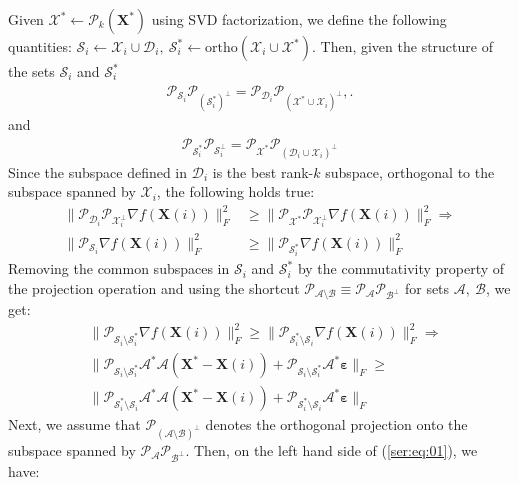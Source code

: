 \documentclass[twocolumn]{svjour3}
\newcommand{\vectornormbig}[1]{\big\|#1\big\|}
\newcommand{\sensing}{\boldsymbol{\mathcal{A}}}
\newcommand{\signal}{\boldsymbol{X}}
\newcommand{\bestsignal}{\boldsymbol{X}^\ast}
\newcommand{\noise}{\boldsymbol{\varepsilon}}
\newcommand{\rank}{k}
\begin{document}
Given $ \mathcal{X}^\ast \leftarrow \mathcal{P}_{\rank}(\bestsignal) $ using SVD factorization, we define the following quantities: $ \mathcal{S}_i \leftarrow \mathcal{X}_i \cup \mathcal{D}_i,~ \mathcal{S}^\ast_i \leftarrow \text{ortho}\left(\mathcal{X}_i \cup \mathcal{X}^\ast\right) $. Then, given the structure of the sets $\mathcal{S}_i$ and $\mathcal{S}_i^{\ast}$
\begin{align}
\mathcal{P}_{\mathcal{S}_i} \mathcal{P}_{(\mathcal{S}_i^\ast)^{\bot}} = \mathcal{P}_{\mathcal{D}_i} \mathcal{P}_{(\mathcal{X}^\ast \cup \mathcal{X}_i)^{\bot}},  \label{ser:eq:00}.
\end{align} and 
\begin{align}
\mathcal{P}_{\mathcal{S}^\ast_i} \mathcal{P}_{\mathcal{S}_i^{\bot}} = \mathcal{P}_{\mathcal{X}^\ast} \mathcal{P}_{(\mathcal{D}_i \cup \mathcal{X}_i)^{\bot}}
\end{align} Since the subspace defined in $ \mathcal{D}_i $ is the best rank-$ \rank $ subspace, orthogonal to the subspace spanned by $ \mathcal{X}_i $, the following holds true:
\begin{align}
\vectornormbig{\mathcal{P}_{\mathcal{D}_i} \mathcal{P}_{\mathcal{X}_i^{\bot}} \nabla f(\signal(i))}_F^2 &\geq \vectornormbig{\mathcal{P}_{\mathcal{X}^\ast} \mathcal{P}_{\mathcal{X}_i^{\bot}} \nabla f(\signal(i))}_F^2 \Rightarrow \nonumber \\
\vectornormbig{\mathcal{P}_{\mathcal{S}_i} \nabla f(\signal(i))}_F^2 &\geq \vectornormbig{\mathcal{P}_{\mathcal{S}_i^\ast} \nabla f(\signal(i))}_F^2 \nonumber
\end{align} Removing the common subspaces in $ \mathcal{S}_i $ and $ \mathcal{S}_i^\ast $ by the commutativity property of the projection operation and using the shortcut $\mathcal{P}_{\mathcal{A} \setminus \mathcal{B}} \equiv \mathcal{P}_{\mathcal{A}} \mathcal{P}_{\mathcal{B}^{\bot}} $ for sets $\mathcal{A}, ~\mathcal{B}$, we get:
\begin{align}
&\vectornormbig{\mathcal{P}_{\mathcal{S}_i \setminus \mathcal{S}_i^\ast} \nabla f(\signal(i))}_F^2 \geq \vectornormbig{\mathcal{P}_{\mathcal{S}_i^\ast \setminus \mathcal{S}_i} \nabla f(\signal(i))}_F^2 \Rightarrow \nonumber \\
&\vectornormbig{\mathcal{P}_{\mathcal{S}_i \setminus \mathcal{S}_i^\ast} \sensing^\ast \sensing (\bestsignal - \signal(i)) + \mathcal{P}_{\mathcal{S}_i \setminus \mathcal{S}_i^\ast} \sensing^\ast \noise}_F \geq \nonumber \\ &\vectornormbig{\mathcal{P}_{\mathcal{S}_i^\ast \setminus \mathcal{S}_i} \sensing^\ast \sensing (\bestsignal - \signal(i)) + \mathcal{P}_{\mathcal{S}_i^\ast \setminus \mathcal{S}_i} \sensing^\ast \noise}_F \label{ser:eq:01}
\end{align} Next, we assume that $\mathcal{P}_{(\mathcal{A} \setminus \mathcal{B})^{\bot}}$ denotes the orthogonal projection onto the subspace spanned by $\mathcal{P}_{\mathcal{A}} \mathcal{P}_{\mathcal{B}^{\bot}}$. Then, on the left hand side of (\ref{ser:eq:01}), we have:
\end{document}
